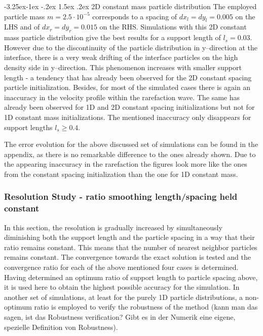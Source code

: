 \documentclass{report}
\makeatletter
\renewcommand\paragraph{\@startsection{paragraph}{4}{\z@}%
  {-3.25ex\@plus -1ex \@minus -.2ex}%
  {1.5ex \@plus .2ex}%
  {\normalfont\normalsize\bfseries}}
\makeatother
\begin{document}
\paragraph{2D constant mass particle distribution}
The employed particle mass $m=2.5\cdot10^{-5}$ corresponds to a spacing of $dx_l=dy_l=0.005$ on the LHS and of $dx_r=dy_r=0.015$ on the RHS.
Simulations with this 2D constant mass particle distribution give the best results for a support length of $l_s=0.03$. However due to the discontinuity of the particle distribution in y--direction at the interface, there is a very weak drifting of the interface particles on the high density side in y--direction. This phenomenon increases with smaller support length - a tendency that has already been observed for the 2D constant spacing particle initialization. 
Besides, for most of the simulated cases there is again an inaccuracy in the velocity profile  within the rarefaction wave. The same has already been observed for 1D and 2D constant spacing initializations but not for 1D constant mass initializations.
The mentioned inaccuracy only disappears for support lengths  $l_s\geq0.4$.

The error evolution for the above discussed set of simulations can be found in the appendix, as there is no remarkable difference to the ones already shown. Due to the appearing inaccuracy in the rarefaction the figures look more like the ones from the constant spacing initialization than the one for 1D constant mass. 



\subsubsection{Resolution Study - ratio smoothing length/spacing held constant}
In this section, the resolution is gradually increased by simultaneously diminishing both the support length and the particle spacing in a way that their ratio remains constant. This means that the number of nearest neighbor particles remains constant. 
The convergence towards the exact solution is tested and the convergence ratio for each of the above mentioned four cases is determined. Having determined an optimum ratio of support length to particle spacing above, it is used here to obtain the highest possible accuracy for the simulation. In another set of simulations, at least for the purely 1D particle distributions, a non-optimum ratio is employed to verify the robustness of the method (kann man das sagen, ist das Robustness verification? Gibt es in der Numerik eine eigene, spezielle Definition von Robustness).
\end{document}
